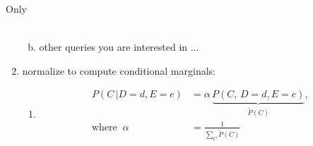 \begin{frame}{Only}
\begin{enumerate}
\begin{enumerate}[(a)]
\begin{align}
		\end{align}
  \item other queries you are interested in $\ldots$
  \end{enumerate}
  \item<only@11> normalize to compute conditional marginals:
  \begin{enumerate}
  \item[]
  \slidesonly{\vspace{-3mm}}
   \begin{align}
            P(C\, | D = d, E = e) &= \alpha \, \underbrace{P(C, \,D = d, E = e)}_{\tilde P(C)},\\
            \text{where} \;\; \alpha &= \frac{1}{\sum_C \tilde P(C)}
		\end{align}
  \end{enumerate}
  
\end{enumerate}
 \endgroup
\end{frame}



